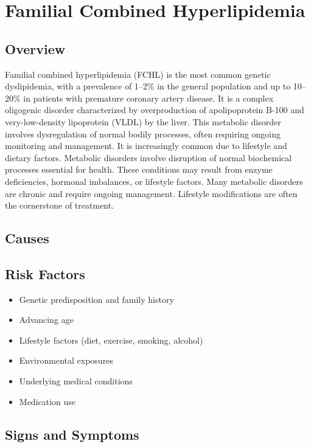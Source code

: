 \chapter{Familial Combined Hyperlipidemia}
\label{sec:Familial Combined Hyperlipidemia}

\section{Overview}
Familial combined hyperlipidemia (FCHL) is the most common genetic dyslipidemia, with a prevalence of 1--2\% in the general population and up to 10--20\% in patients with premature coronary artery disease. It is a complex oligogenic disorder characterized by overproduction of apolipoprotein B-100 and very-low-density lipoprotein (VLDL) by the liver. This metabolic disorder involves dysregulation of normal bodily processes, often requiring ongoing monitoring and management. It is increasingly common due to lifestyle and dietary factors. Metabolic disorders involve disruption of normal biochemical processes essential for health. These conditions may result from enzyme deficiencies, hormonal imbalances, or lifestyle factors. Many metabolic disorders are chronic and require ongoing management. Lifestyle modifications are often the cornerstone of treatment.
\section{Causes}
\section{Risk Factors}
\begin{itemize}[noitemsep]
  \item Genetic predisposition and family history
  \item Advancing age
  \item Lifestyle factors (diet, exercise, smoking, alcohol)
  \item Environmental exposures
  \item Underlying medical conditions
  \item Medication use
\end{itemize}
\section{Signs and Symptoms}
